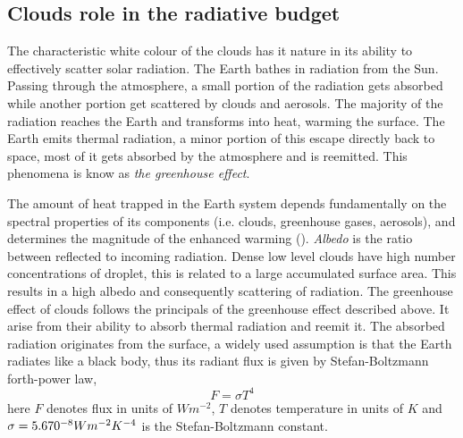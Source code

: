 \subsection{Clouds role in the radiative budget}
The characteristic white colour of the clouds has it nature in its ability to  effectively scatter solar radiation. %
The Earth bathes in radiation from the Sun. Passing through the atmosphere, a small portion of the radiation gets absorbed while another portion get scattered by clouds and aerosols. The majority of the radiation reaches the Earth and transforms into heat, warming the surface. The Earth emits thermal radiation, a minor portion of this escape directly back to space, most of it gets absorbed by the atmosphere and is reemitted. This phenomena is know as \textit{the greenhouse effect}. 


The amount of heat trapped in the Earth system depends fundamentally on the spectral properties of its components (i.e. clouds, greenhouse gases, aerosols), and determines the magnitude of the enhanced warming (\cite{greenhouse_effect}).
\textit{Albedo} is the ratio between reflected to incoming radiation. Dense low level clouds have high number concentrations of droplet, this is related to a large accumulated surface area. This results in a high albedo and consequently scattering of radiation. The greenhouse effect of clouds follows the principals of the greenhouse effect described above. It arise from their ability to absorb thermal radiation and reemit it. The absorbed radiation originates from the surface, a widely used assumption is that the Earth radiates like a black body, thus its radiant flux is given by Stefan-Boltzmann forth-power law, 
\begin{equation} \label{eq:stefan-boltzmann}
    F = \sigma  T ^4 %
\end{equation}
here $F$ denotes flux in units of $W m^{-2}$, $T$ denotes temperature in units of $K$ and \\  $\sigma = 5.670 \time 10^{-8} W m^{-2} K^{-4}$ is the Stefan-Boltzmann constant. 

